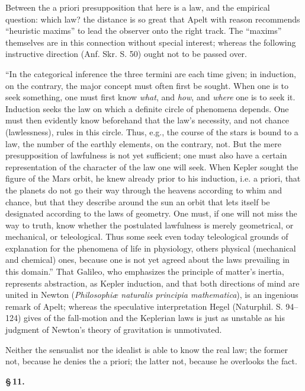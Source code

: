 \documentclass[12pt]{book}
\begin{document}
Between the a priori presupposition that here is a law, and the empirical question:
which law? the distance is so great that Apelt with reason recommends ``heuristic
maxims'' to lead the observer onto the right track. The ``maxims'' themselves are in
this connection without special interest; whereas the following instructive
direction (Anf. Skr. S. 50) ought not to be passed over.

``In the categorical inference the three termini are each time given; in induction,
on the contrary, the major concept must often first be sought. When one is to seek
something, one must first know \emph{what}, and \emph{how}, and \emph{where} one is
to seek it. Induction seeks the law on which a definite circle of phenomena
depends. One must then evidently know beforehand that the law's necessity, and not
chance (lawlessness), rules in this circle. Thus, e.g., the course of the stars is
bound to a law, the number of the earthly elements, on the contrary, not. But the
mere presupposition of lawfulness is not yet sufficient; one must also have a
certain representation of the character of the law one will seek. When Kepler
sought the figure of the Mars orbit, he knew already prior to his induction, i.e. a
priori, that the planets do not go their way through the heavens according to whim
and chance, but that they describe around the sun an orbit that lets itself be
designated according to the laws of geometry. One must, if one will not miss the way
to truth, know whether the postulated lawfulness is merely geometrical, or
mechanical, or teleological. Thus some seek even today teleological grounds of
explanation for the phenomena of life in physiology, others physical (mechanical
and chemical) ones, because one is not yet agreed about the laws prevailing in this
domain.''
That Galileo, who emphasizes the principle of matter's inertia, represents
abstraction, as Kepler induction, and that both directions of mind are united in
Newton (\textit{Philosophiæ naturalis principia mathematica}), is an ingenious
remark of Apelt; whereas the speculative interpretation Hegel (Naturphil. S.
94--124) gives of the fall-motion and the Keplerian laws is just as unstable as his
judgment of Newton's theory of gravitation is unmotivated.

Neither the sensualist nor the idealist is able to know the real law; the former
not, because he denies the a priori; the latter not, because he overlooks the fact.

\begin{center}{\bfseries \S\,11.}\end{center}
\end{document}
